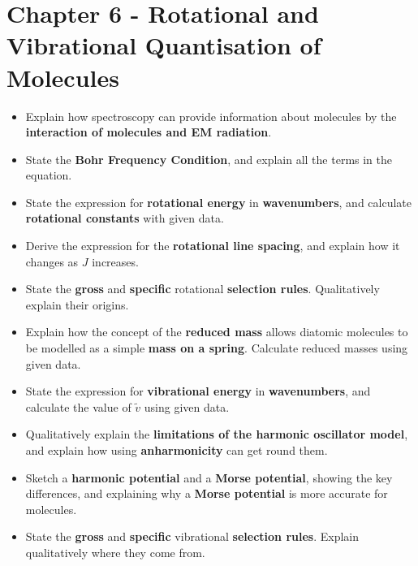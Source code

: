 \documentclass{memoir}[11pt,oneside,a4paper,openany]
\begin{document}
\section*{Chapter 6 - Rotational and Vibrational Quantisation of Molecules}
\begin{itemize}
	\item Explain how spectroscopy can provide information about molecules by the \textbf{interaction of molecules and EM radiation}.
	\item State the \textbf{Bohr Frequency Condition}, and explain all the terms in the equation.
	\item State the expression for \textbf{rotational energy} in \textbf{wavenumbers}, and calculate \textbf{rotational constants} with given data.
	\item Derive the expression for the \textbf{rotational line spacing}, and explain how it changes as $J$ increases.
	\item State the \textbf{gross} and \textbf{specific} rotational \textbf{selection rules}. Qualitatively explain their origins.
	\item Explain how the concept of the \textbf{reduced mass} allows diatomic molecules to be modelled as a simple \textbf{mass on a spring}. Calculate reduced masses using given data.
	\item State the expression for \textbf{vibrational energy} in \textbf{wavenumbers}, and calculate the value of $\tilde{v}$ using given data.
	\item Qualitatively explain the \textbf{limitations of the harmonic oscillator model}, and explain how using \textbf{anharmonicity} can get round them.
	\item Sketch a \textbf{harmonic potential} and a \textbf{Morse potential}, showing the key differences, and explaining why a \textbf{Morse potential} is more accurate for molecules.
	\item State the \textbf{gross} and \textbf{specific} vibrational \textbf{selection rules}. Explain qualitatively where they come from.
\end{itemize}
\end{document}
